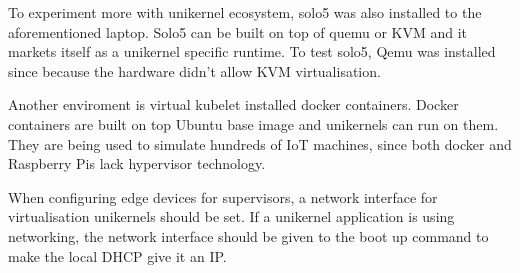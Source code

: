 To experiment more with unikernel ecosystem, solo5 was also installed to the aforementioned laptop. Solo5 can be built on top of quemu or KVM and it markets itself as a unikernel specific runtime. To test solo5, Qemu was installed since because the hardware didn't allow KVM virtualisation.

Another enviroment is virtual kubelet installed docker containers. Docker containers are built on top Ubuntu base image and unikernels can run on them. They are being used to simulate hundreds of IoT machines, since both docker and Raspberry Pis lack hypervisor technology.

When configuring edge devices for supervisors, a network interface for virtualisation unikernels should be set. If a unikernel application is using networking, the network interface should be given to the boot up command to make the local DHCP give it an IP.
